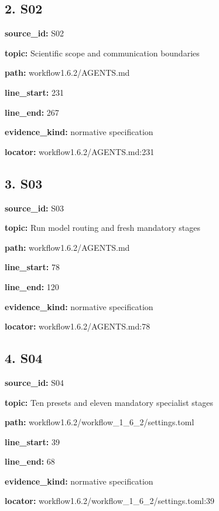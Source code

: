 \documentclass[10pt,a4paper]{article}
\begin{document}
\subsection*{2.\allowbreak{} S02}
\textbf{source\_\allowbreak{}id:} S02\par
\textbf{topic:} Scientific scope and communication boundaries\par
\textbf{path:} workflow1.\allowbreak{}6.\allowbreak{}2/\allowbreak{}AGENTS.\allowbreak{}md\par
\textbf{line\_\allowbreak{}start:} 231\par
\textbf{line\_\allowbreak{}end:} 267\par
\textbf{evidence\_\allowbreak{}kind:} normative specification\par
\textbf{locator:} workflow1.\allowbreak{}6.\allowbreak{}2/\allowbreak{}AGENTS.\allowbreak{}md:231\par
\subsection*{3.\allowbreak{} S03}
\textbf{source\_\allowbreak{}id:} S03\par
\textbf{topic:} Run model routing and fresh mandatory stages\par
\textbf{path:} workflow1.\allowbreak{}6.\allowbreak{}2/\allowbreak{}AGENTS.\allowbreak{}md\par
\textbf{line\_\allowbreak{}start:} 78\par
\textbf{line\_\allowbreak{}end:} 120\par
\textbf{evidence\_\allowbreak{}kind:} normative specification\par
\textbf{locator:} workflow1.\allowbreak{}6.\allowbreak{}2/\allowbreak{}AGENTS.\allowbreak{}md:78\par
\subsection*{4.\allowbreak{} S04}
\textbf{source\_\allowbreak{}id:} S04\par
\textbf{topic:} Ten presets and eleven mandatory specialist stages\par
\textbf{path:} workflow1.\allowbreak{}6.\allowbreak{}2/\allowbreak{}workflow\_\allowbreak{}1\_\allowbreak{}6\_\allowbreak{}2/\allowbreak{}settings.\allowbreak{}toml\par
\textbf{line\_\allowbreak{}start:} 39\par
\textbf{line\_\allowbreak{}end:} 68\par
\textbf{evidence\_\allowbreak{}kind:} normative specification\par
\textbf{locator:} workflow1.\allowbreak{}6.\allowbreak{}2/\allowbreak{}workflow\_\allowbreak{}1\_\allowbreak{}6\_\allowbreak{}2/\allowbreak{}settings.\allowbreak{}toml:39\par
\end{document}
